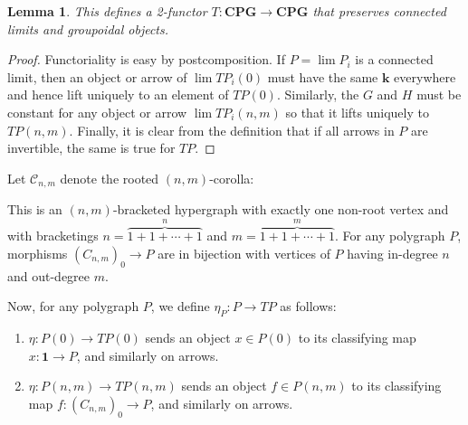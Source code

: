 \documentclass{article}
\newtheorem{lem}[thm]{Lemma}
\theoremstyle{definition}
\theoremstyle{remark}
\def\C{\mathcal{C}}
\def\cpg{\ensuremath{\mathbf{CPG}}\xspace}
\begin{document}
\begin{lem}
  This defines a 2-functor $T:\cpg\to\cpg$ that preserves connected limits and groupoidal objects.
\end{lem}
\begin{proof}
  Functoriality is easy by postcomposition.
  If $P = \lim P_i$ is a connected limit, then an object or arrow of $\lim T P_i(0)$ must have the same $\mathbf{k}$ everywhere and hence lift uniquely to an element of $T P(0)$.
  Similarly, the $G$ and $H$ must be constant for any object or arrow $\lim T P_i(n,m)$ so that it lifts uniquely to $T P (n,m)$.
  Finally, it is clear from the definition that if all arrows in $P$ are invertible, the same is true for $TP$.
\end{proof}

Let $\C_{n,m}$ denote the rooted $(n,m)$-corolla:
\begin{center}
\end{center}
This is an $(n,m)$-bracketed hypergraph with exactly one non-root vertex and with bracketings $n=\overbrace{1+1+\cdots+1}^n$ and $m=\overbrace{1+1+\cdots+1}^m$.
For any polygraph $P$, morphisms $(C_{n,m})_0 \to P$ are in bijection with vertices of $P$ having in-degree $n$ and out-degree $m$.

Now, for any polygraph $P$, we define $\eta_P : P \to T P$ as follows:
\begin{enumerate}
\item $\eta:P(0) \to TP(0)$ sends an object $x\in P(0)$ to its classifying map $x:\mathbf{1}\to P$, and similarly on arrows.
\item $\eta:P(n,m) \to TP(n,m)$ sends an object $f\in P(n,m)$ to its classifying map $f:(C_{n,m})_0\to P$, and similarly on arrows.
\end{enumerate}
\end{document}

